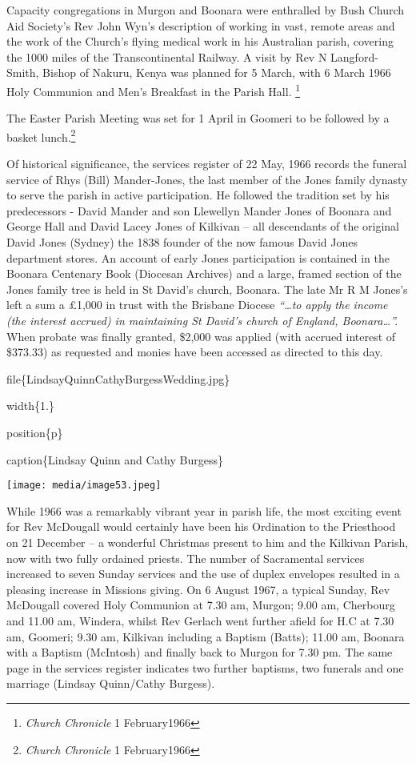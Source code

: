 Capacity congregations in Murgon and Boonara were enthralled by Bush Church Aid Society's Rev John Wyn's description of working in vast, remote areas and the work of the Church's flying medical work in his Australian parish, covering the 1000 miles of the Transcontinental Railway. A visit by Rev N Langford-Smith, Bishop of Nakuru, Kenya was planned for 5 March, with 6 March 1966 Holy Communion and Men's Breakfast in the Parish Hall. \footnote{\emph{Church Chronicle} 1 February1966}

The Easter Parish Meeting was set for 1 April in Goomeri to be followed by a basket lunch.\footnote{\emph{Church Chronicle} 1 February1966}

Of historical significance, the services register of 22 May, 1966 records the funeral service of Rhys (Bill) Mander-Jones, the last member of the Jones family dynasty to serve the parish in active participation. He followed the tradition set by his predecessors - David Mander and son Llewellyn Mander Jones of Boonara and George Hall and David Lacey Jones of Kilkivan -- all descendants of the original David Jones (Sydney) the 1838 founder of the now famous David Jones department stores. An account of early Jones participation is contained in the Boonara Centenary Book (Diocesan Archives) and a large, framed section of the Jones family tree is held in St David's church, Boonara. The late Mr R M Jones's left a sum a £1,000 in trust with the Brisbane Diocese \emph{``\ldots to apply the income (the interest accrued) in maintaining St David's church of England, Boonara\ldots''.} When probate was finally granted, \$2,000 was applied (with accrued interest of \$373.33) as requested and monies have been accessed as directed to this day.

file\{LindsayQuinnCathyBurgessWedding.jpg\}

width\{1.\}

position\{p\}

caption\{Lindsay Quinn and Cathy Burgess\}

\texttt{[image: media/image53.jpeg]}

While 1966 was a remarkably vibrant year in parish life, the most exciting event for Rev McDougall would certainly have been his Ordination to the Priesthood on 21 December -- a wonderful Christmas present to him and the Kilkivan Parish, now with two fully ordained priests. The number of Sacramental services increased to seven Sunday services and the use of duplex envelopes resulted in a pleasing increase in Missions giving. On 6 August 1967, a typical Sunday, Rev McDougall covered Holy Communion at 7.30 am, Murgon; 9.00 am, Cherbourg and 11.00 am, Windera, whilst Rev Gerlach went further afield for H.C at 7.30 am, Goomeri; 9.30 am, Kilkivan including a Baptism (Batts); 11.00 am, Boonara with a Baptism (McIntosh) and finally back to Murgon for 7.30 pm. The same page in the services register indicates two further baptisms, two funerals and one marriage (Lindsay Quinn/Cathy Burgess).

